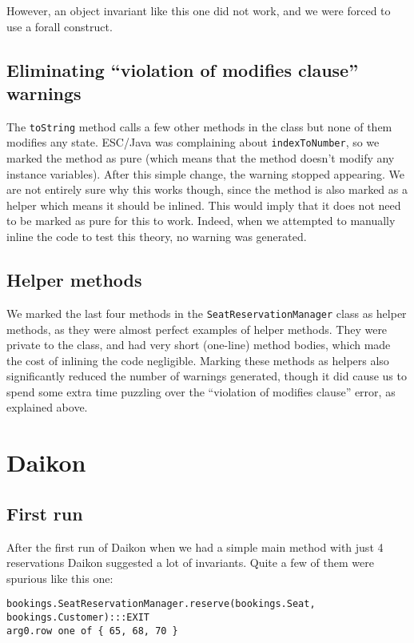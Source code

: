 \documentclass[11pt]{article}
\begin{document}
However, an object invariant like this one did not work, and we were forced to use a forall construct.

\subsection{Eliminating ``violation of modifies clause'' warnings}

The \verb|toString| method calls a few other methods in the class but none of them modifies any state. ESC/Java was complaining about \verb|indexToNumber|, so we marked the method as pure (which means that the method doesn't modify any instance variables). After this simple change, the warning stopped appearing. We are not entirely sure why this works though, since the method is also marked as a helper which means it should be inlined. This would imply that it does not need to be marked as pure for this to work. Indeed, when we attempted to manually inline the code to test this theory, no warning was generated.

\subsection{Helper methods}

We marked the last four methods in the \verb|SeatReservationManager| class as helper methods, as they were almost perfect examples of helper methods. They were private to the class, and had very short (one-line) method bodies, which made the cost of inlining the code negligible. Marking these methods as helpers also significantly reduced the number of warnings generated, though it did cause us to spend some extra time puzzling over the ``violation of modifies clause'' error, as explained above.

\section{Daikon}

\subsection{First run}

After the first run of Daikon when we had a simple main method with just 4 reservations Daikon suggested a lot of invariants. Quite a few of them were spurious like this one:

\noindent
\begin{verbatim}
bookings.SeatReservationManager.reserve(bookings.Seat, bookings.Customer):::EXIT
arg0.row one of { 65, 68, 70 }
\end{verbatim}
\end{document}
